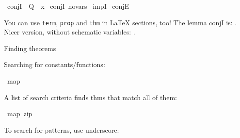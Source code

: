 \begin{isabellebody}
\begin{isamarkuptext}
\end{isamarkuptext}\isamarkuptrue%
\isamarkupfalse%
\ conjI\ {\isacharbrackleft}{\kern0pt}\ {\isacharquery}{\kern0pt}Q\ {\isacharequal}{\kern0pt}\ {\isachardoublequoteopen}x{\isachardoublequoteclose}{\isacharbrackright}{\kern0pt}\isanewline
{}\isamarkupfalse%
\ conjI\ {\isacharbrackleft}{\kern0pt}no{\isacharunderscore}{\kern0pt}vars{\isacharbrackright}{\kern0pt}\isanewline
{}\isamarkupfalse%
\ impI\isanewline
{}\isamarkupfalse%
\ conjE%
\begin{isamarkuptext}%
You can use \texttt{term}, \texttt{prop} and \texttt{thm} in \LaTeX
  sections, too!  The lemma conjI is: . Nicer version, 
  without schematic variables: .%
\end{isamarkuptext}\isamarkuptrue%
%
\begin{isamarkuptext}%
Finding theorems%
\end{isamarkuptext}\isamarkuptrue%
%
\begin{isamarkuptext}%
Searching for constants/functions:%
\end{isamarkuptext}\isamarkuptrue%
\isamarkupfalse%
\ {\isachardoublequoteopen}map{\isachardoublequoteclose}%
\begin{isamarkuptext}%
A list of search criteria finds thms that match all of them:%
\end{isamarkuptext}\isamarkuptrue%
\isamarkupfalse%
\ {\isachardoublequoteopen}map{\isachardoublequoteclose}\ {\isachardoublequoteopen}zip{\isachardoublequoteclose}%
\begin{isamarkuptext}%
To search for patterns, use underscore:%
\end{isamarkuptext}\isamarkuptrue%
\isamarkupfalse%
\ {\isachardoublequoteopen}{\isacharunderscore}{\kern0pt}\ {\isacharplus}{\kern0pt}\ {\isacharunderscore}{\kern0pt}\ {\isacharequal}{\kern0pt}\ {\isacharunderscore}{\kern0pt}\ {\isacharminus}{\kern0pt}\ {\isacharunderscore}{\kern0pt}{\isachardoublequoteclose}\isanewline
{}\isamarkupfalse%

\end{isabellebody}

